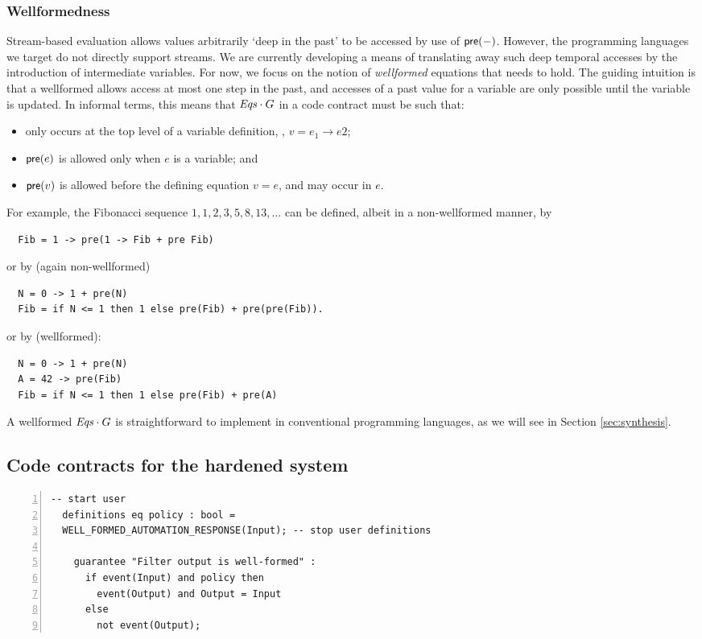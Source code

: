 \subsubsection*{Wellformedness}
Stream-based evaluation allows values arbitrarily `deep in the past'
to be accessed by use of $\mathsf{pre}(-)$. However, the programming
languages we target do not directly support streams.  We are currently
developing a means of translating away such deep temporal accesses by
the introduction of intermediate variables. For now, we focus on the
notion of \emph{wellformed} equations that needs to hold. The guiding
intuition is that a wellformed {\Eqs} allows access at most one step
in the past, and accesses of a past value for a variable are only
possible until the variable is updated. In informal terms, this means
that ${\mathit{Eqs}}\cdot G$ in a code contract must be such that:
\begin{itemize}
\item {} only occurs at the top level of a variable definition, \eg, $v = e_1 \to e2$;
\item $\mathsf{pre}(e)$ is allowed only when $e$ is a variable; and
\item $\mathsf{pre}(v)$ is allowed before the defining equation $v = e$, and may occur in $e$.
\end{itemize}
For example, the Fibonacci sequence $1,1,2,3,5,8,13,\ldots$ can be
defined, albeit in a non-wellformed manner, by
{\small
\begin{verbatim}
  Fib = 1 -> pre(1 -> Fib + pre Fib)
\end{verbatim}
}
\noindent or by (again non-wellformed)
{\small
\begin{verbatim}
  N = 0 -> 1 + pre(N)
  Fib = if N <= 1 then 1 else pre(Fib) + pre(pre(Fib)).
\end{verbatim}
}
\noindent or by (wellformed):
{\small
\begin{verbatim}
  N = 0 -> 1 + pre(N)
  A = 42 -> pre(Fib)
  Fib = if N <= 1 then 1 else pre(Fib) + pre(A)
\end{verbatim}
}
A wellformed ${\mathit{Eqs}} \cdot G$ is straightforward to implement in
conventional programming languages, as we will see in
Section \ref{sec:synthesis}.

\subsection{Code contracts for the hardened system}

\newsavebox{\flt}
\begin{lrbox}{\flt}
  \begin{lstlisting}[style=agree,numbers=left] -- start user
  definitions eq policy : bool =
  WELL_FORMED_AUTOMATION_RESPONSE(Input); -- stop user definitions

    guarantee "Filter output is well-formed" :
      if event(Input) and policy then
        event(Output) and Output = Input
      else
        not event(Output);
  \end{lstlisting}
\end{lrbox}

